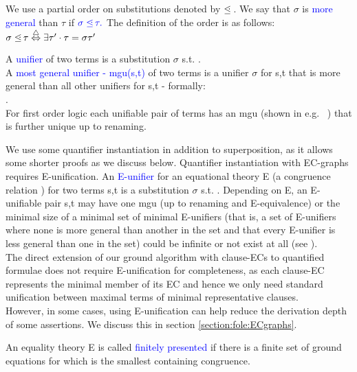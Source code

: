 \bigskip
\noindent
We use a partial order on substitutions denoted by $\leqdot$. We say that $\sigma$ is \textcolor{blue}{more general} than $\tau$ if $\textcolor{blue}{\sigma \leqdot \tau.}$ The definition of the order is as follows:\\
$\sigma \leqdot \tau \equivdef \exists \tau' \cdot \tau = \sigma\tau'$

\bigskip
\noindent
A \textcolor{blue}{unifier} of two terms  is a substitution $\sigma$ s.t. .\\
A \textcolor{blue}{most general unifier - mgu(s,t)} of two terms  is a unifier $\sigma$ for s,t that is more general than all other unifiers for s,t - formally:\\
.\\
For first order logic each unifiable pair of terms has an mgu (shown in e.g. ~\cite{Baader2001445}) that is further unique up to renaming. 

\bigskip
\noindent
We use some quantifier instantiation in addition to superposition, as it allows some shorter proofs as we discuss below. Quantifier instantiation with EC-graphs requires E-unification.
An \textcolor{blue}{E-unifier} for an equational theory E (a congruence relation ) for two terms s,t is a substitution $\sigma$ s.t. . Depending on E, an E-unifiable pair s,t may have one mgu (up to renaming and E-equivalence) or the minimal size of a minimal set of minimal E-unifiers 
(that is, a set of E-unifiers where none is more general than another in the set and that every E-unifier is less general than one in the set) could be infinite or not exist at all (see  \cite{Baader2001445}).\\
The direct extension of our ground algorithm with clause-ECs to quantified formulae does not require E-unification for completeness, 
as each clause-EC represents the minimal member of its EC and hence we only need standard unification between maximal terms of minimal representative clauses.\\
However, in some cases, using E-unification can help reduce the derivation depth of some assertions. We discuss this in section \ref{section:fole:ECgraphs}.

An equality theory E is called \textcolor{blue}{finitely presented} if there is a finite set of ground equations for which  is the smallest containing congruence.



